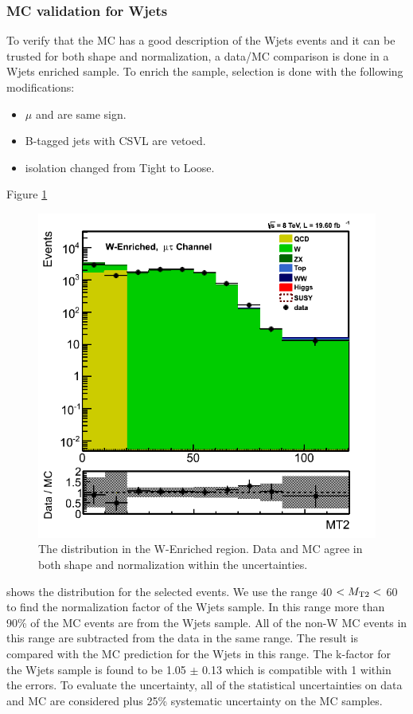\subsubsection{MC validation for Wjets}
To verify that the MC has a good description of the Wjets events and it can be trusted for both shape and normalization, a data/MC comparison 
is done in a Wjets enriched sample. To enrich the sample, \muTau selection is done with the following modifications:
\begin{itemize}
\item $\mu$ and \Tau are same sign.
\item B-tagged jets with CSVL are vetoed.
\item \Tau isolation changed from Tight to Loose.
\end{itemize}
Figure \ref{fig:mt2_WValidation} 
\begin{figure}[htbp]
\centering
\includegraphics[angle=0,scale=0.35]{TauTauFigs/MT2_WValidation.png}
\caption{The \mttwo distribution in the W-Enriched region. Data and MC agree in both shape and normalization within the uncertainties.}
\label{fig:mt2_WValidation}
\end{figure}
shows the \mttwo distribution for the selected events. We use the range 40 $<{M_{\rm T2}}<$ 60 \GeV to find the normalization factor of the 
Wjets sample. In this range more than 90\% of the MC events are from the Wjets sample. 
All of the non-W MC events in this range are subtracted from 
the data in the same range. The result is compared with the MC prediction for the Wjets in this range. The k-factor for the Wjets sample is 
found to be 1.05 $\pm$ 0.13 which is compatible with 1 within the errors. To evaluate the uncertainty, all of the statistical uncertainties on data 
and MC are considered plus 25\% systematic uncertainty on the MC samples.


